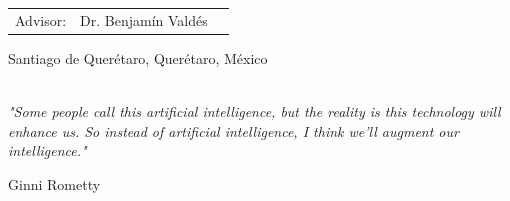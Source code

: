 \documentclass[11pt, a4paper, oneside]{thesis} %
\begin{document}
\begin{titlepage}
\begin{center}
\begin{table}[!h]
\begin{center}
\begin{tabular}{lll}
\multicolumn{1}{r}{Advisor:} & Dr. Benjamín Valdés \\  %
\end{tabular}
\end{center}
\end{table}

\vspace{3cm}
Santiago de Querétaro, Querétaro, México \\

{\large {}}\\[1.5cm]%
\vfill
\end{center}

\end{titlepage}


\clearpage %


\pagestyle{empty} %
\null\vfill

\begin{center}
\textit{"Some people call this artificial intelligence, but the reality is this
technology will enhance us. So instead of artificial intelligence, I think
we’ll augment our intelligence."}
\end{center}

\begin{flushright}
Ginni Rometty
\end{flushright}

\vfill\vfill\vfill\vfill\vfill\vfill\null 

\clearpage



\end{document}
